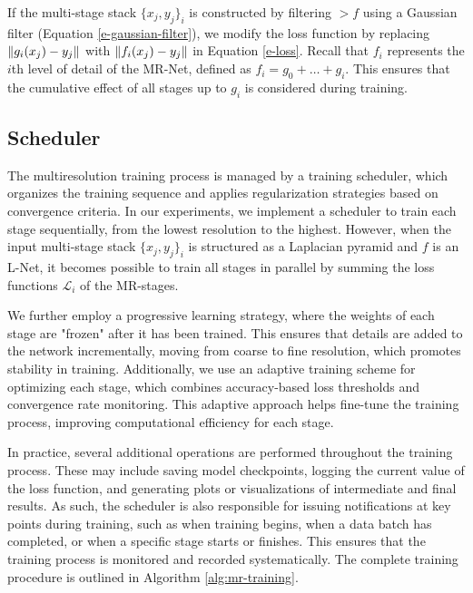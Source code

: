 If the multi-stage stack $\{x_j, y_j\}_i$ is constructed by filtering $\gt{f}$ using a Gaussian filter (Equation \ref{e-gaussian-filter}), we modify the loss function by replacing $\lVert g_i(x_j) - y_j\rVert$ with $\lVert f_i(x_j) - y_j\rVert$ in Equation \ref{e-loss}. Recall that $f_i$ represents the $i$th level of detail of the MR-Net, defined as $f_i = g_0 + \dots + g_i$. This ensures that the cumulative effect of all stages up to $g_i$ is considered during training.



\subsection{Scheduler}


The multiresolution training process is managed by a training scheduler, which organizes the training sequence and applies regularization strategies based on convergence criteria. In our experiments, we implement a scheduler to train each stage sequentially, from the lowest resolution to the highest. However, when the input multi-stage stack $\{x_j, y_j\}_i$ is structured as a Laplacian pyramid and $f$ is an L-Net, it becomes possible to train all stages in parallel by summing the loss functions $\mathcal{L}_i$ of the MR-stages.

We further employ a progressive learning strategy, where the weights of each stage are "frozen" after it has been trained. This ensures that details are added to the network incrementally, moving from coarse to fine resolution, which promotes stability in training. Additionally, we use an adaptive training scheme for optimizing each stage, which combines accuracy-based loss thresholds and convergence rate monitoring. This adaptive approach helps fine-tune the training process, improving computational efficiency for each stage.

In practice, several additional operations are performed throughout the training process. These may include saving model checkpoints, logging the current value of the loss function, and generating plots or visualizations of intermediate and final results. As such, the scheduler is also responsible for issuing notifications at key points during training, such as when training begins, when a data batch has completed, or when a specific stage starts or finishes. This ensures that the training process is monitored and recorded systematically. The complete training procedure is outlined in Algorithm \ref{alg:mr-training}.

